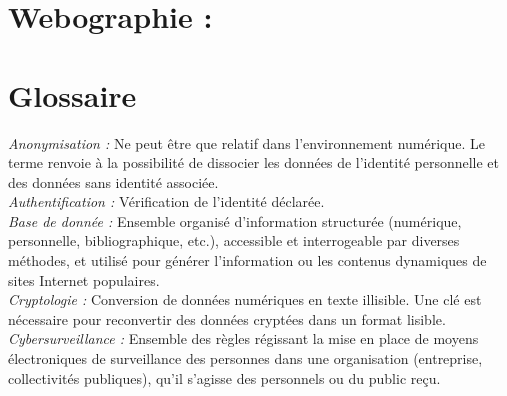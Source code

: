 \documentclass[a4paper,12pt]{article}
\begin{document}
\section*{Webographie :}
\section*{Glossaire}

\emph{Anonymisation :} Ne peut être que relatif dans l’environnement numérique. Le terme renvoie à la possibilité de dissocier les données de l’identité personnelle et des données sans identité associée. \\


\emph{Authentification :} Vérification de l’identité déclarée.\\


\emph{Base de donnée :} Ensemble organisé d’information structurée (numérique, personnelle, bibliographique, etc.), accessible et interrogeable par diverses méthodes, et utilisé pour générer l’information ou les contenus dynamiques de sites Internet populaires.\\

\emph{Cryptologie :} Conversion de données numériques en texte illisible. Une clé est nécessaire pour reconvertir des données cryptées dans un format lisible.\\


\emph{Cybersurveillance :} Ensemble des règles régissant la mise en place de moyens électroniques de surveillance des personnes dans une organisation (entreprise, collectivités publiques), qu’il s’agisse des personnels ou du public reçu. \\
\end{document}
